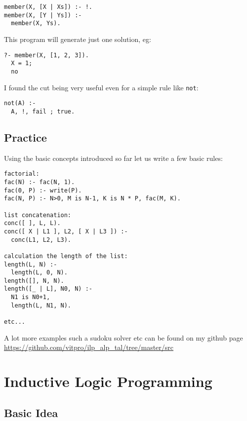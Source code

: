 \documentclass[11pt]{article}
\begin{document}
\begin{lstlisting}
member(X, [X | Xs]) :- !.
member(X, [Y | Ys]) :-
  member(X, Ys).
\end{lstlisting}
This program will generate just one solution, eg:
\begin{lstlisting}
?- member(X, [1, 2, 3]).
  X = 1;
  no
\end{lstlisting}
I found the cut being very useful even for a simple rule like \texttt{not}:
\begin{lstlisting}
not(A) :-
  A, !, fail ; true.
\end{lstlisting}


\subsection{Practice}
Using the basic concepts introduced so far let us write a few basic rules:
\begin{lstlisting}
factorial:
fac(N) :- fac(N, 1).
fac(0, P) :- write(P).
fac(N, P) :- N>0, M is N-1, K is N * P, fac(M, K).

list concatenation:
conc([ ], L, L).
conc([ X | L1 ], L2, [ X | L3 ]) :- 
  conc(L1, L2, L3).

calculation the length of the list:
length(L, N) :-
  length(L, 0, N).
length([], N, N).
length([_ | L], N0, N) :-
  N1 is N0+1,
  length(L, N1, N).

etc...
\end{lstlisting}
A lot more examples such a sudoku solver etc can be found on my github page \url{https://github.com/vitpro/ilp_alp_tal/tree/master/src}


\section{Inductive Logic Programming}

\subsection{Basic Idea}
\end{document}
